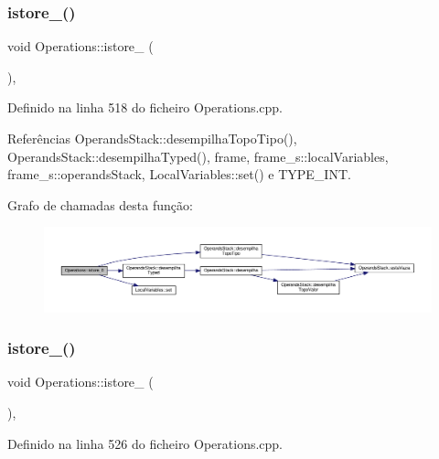 \subsubsection{\texorpdfstring{istore\+\_()}{istore\_0()}}
{\footnotesize\ttfamily void Operations\+::istore\+\_ (\begin{DoxyParamCaption}{ }\end{DoxyParamCaption})\hspace{0.3cm}{\ttfamily [static]}, {\ttfamily [private]}}



Definido na linha 518 do ficheiro Operations.\+cpp.



Referências Operands\+Stack\+::desempilha\+Topo\+Tipo(), Operands\+Stack\+::desempilha\+Typed(), frame, frame\+\_\+s\+::local\+Variables, frame\+\_\+s\+::operands\+Stack, Local\+Variables\+::set() e T\+Y\+P\+E\+\_\+\+I\+NT.

Grafo de chamadas desta função\+:\nopagebreak
\begin{figure}[H]
\begin{center}
\leavevmode
\includegraphics[width=350pt]{classOperations_ae0a17c510b570467f5b025e3dcbe1398_cgraph}
\end{center}
\end{figure}
\mbox{\label{classOperations_aeb89677195b16d5c595ec9faaddc2c76}} 
\subsubsection{\texorpdfstring{istore\+\_()}{istore\_1()}}
{\footnotesize\ttfamily void Operations\+::istore\+\_ (\begin{DoxyParamCaption}{ }\end{DoxyParamCaption})\hspace{0.3cm}{\ttfamily [static]}, {\ttfamily [private]}}



Definido na linha 526 do ficheiro Operations.\+cpp.



